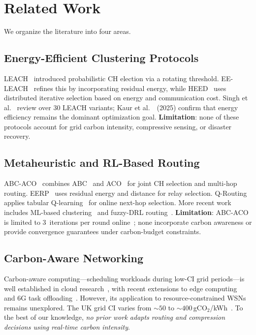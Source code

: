 \section{Related Work}
\label{art2:sec:related}

We organize the literature into four areas.

\subsection{Energy-Efficient Clustering Protocols}
LEACH~\cite{heinzelman2000leach} introduced probabilistic CH election via a rotating threshold.
EE-LEACH~\cite{bakaraniya2013eeleach} refines this by incorporating residual energy, while HEED~\cite{younis2004heed} uses distributed iterative selection based on energy and communication cost.
Singh et al.~\cite{singh2017survey} review over 30 LEACH variants; Kaur et al.~\cite{kaur2025energy}~(2025) confirm that energy efficiency remains the dominant optimization goal.
\textbf{Limitation}: none of these protocols account for grid carbon intensity, compressive sensing, or disaster recovery.

\subsection{Metaheuristic and RL-Based Routing}
ABC-ACO~\cite{elkhediri2024abcaco} combines ABC~\cite{karaboga2007abc} and ACO~\cite{dorigo2004ant} for joint CH selection and multi-hop routing.
EERP~\cite{biswas2018eerp} uses residual energy and distance for relay selection.
Q-Routing~\cite{boyan1994qrouting} applies tabular Q-learning~\cite{watkins1992qlearning} for online next-hop selection.
More recent work includes ML-based clustering~\cite{akram2025eemlcr} and fuzzy-DRL routing~\cite{wang2025fuzzy_drl}.
\textbf{Limitation}: ABC-ACO is limited to 3~iterations per round online~\cite{kuila2014abc_wsn}; none incorporate carbon awareness or provide convergence guarantees under carbon-budget constraints.

\subsection{Carbon-Aware Networking}
Carbon-aware computing---scheduling workloads during low-CI grid periods---is well established in cloud research~\cite{urgaonkar2011green, freitag2021ict}, with recent extensions to edge computing~\cite{huynh2025carbon_dt} and 6G task offloading~\cite{navaprakash2026carbon}.
However, its application to resource-constrained WSNs remains unexplored.
The UK grid CI varies from ${\sim}50$ to ${\sim}400$\,gCO$_2$/kWh~\cite{uk_carbon_api, ember2024}.
To the best of our knowledge, \emph{no prior work adapts routing and compression decisions using real-time carbon intensity}.

